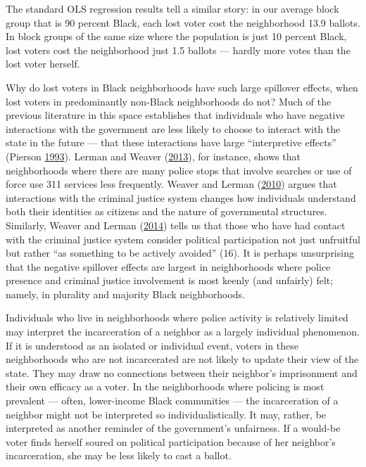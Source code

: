 \documentclass[12pt,]{article}
\begin{document}
The standard OLS regression results tell a similar story: in our average block group that is 90 percent Black, each lost voter cost the neighborhood 13.9 ballots. In block groups of the same size where the population is just 10 percent Black, lost voters cost the neighborhood just 1.5 ballots --- hardly more votes than the lost voter herself.

Why do lost voters in Black neighborhoods have such large spillover effects, when lost voters in predominantly non-Black neighborhoods do not? Much of the previous literature in this space establishes that individuals who have negative interactions with the government are less likely to choose to interact with the state in the future --- that these interactions have large ``interpretive effects'' (Pierson \protect\hyperlink{ref-Pierson1993}{1993}). Lerman and Weaver (\protect\hyperlink{ref-Lerman2013}{2013}), for instance, shows that neighborhoods where there are many police stops that involve searches or use of force use 311 services less frequently. Weaver and Lerman (\protect\hyperlink{ref-Weaver2010}{2010}) argues that interactions with the criminal justice system changes how individuals understand both their identities as citizens and the nature of governmental structures. Similarly, Weaver and Lerman (\protect\hyperlink{ref-Weaver2014}{2014}) tells us that those who have had contact with the criminal justice system consider political participation not just unfruitful but rather ``as something to be actively avoided'' (16). It is perhaps unsurprising that the negative spillover effects are largest in neighborhoods where police presence and criminal justice involvement is most keenly (and unfairly) felt; namely, in plurality and majority Black neighborhoods.

Individuals who live in neighborhoods where police activity is relatively limited may interpret the incarceration of a neighbor as a largely individual phenomenon. If it is understood as an isolated or individual event, voters in these neighborhoods who are not incarcerated are not likely to update their view of the state. They may draw no connections between their neighbor's imprisonment and their own efficacy as a voter. In the neighborhoods where policing is most prevalent --- often, lower-income Black communities --- the incarceration of a neighbor might not be interpreted so individualistically. It may, rather, be interpreted as another reminder of the government's unfairness. If a would-be voter finds herself soured on political participation because of her neighbor's incarceration, she may be less likely to cast a ballot.
\end{document}
